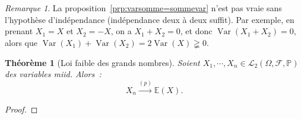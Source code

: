 \documentclass{article}
\newcommand{\E}{\mathbb E}
\renewcommand{\P}{\mathbb P}
\newcommand{\espproba}[3]{\left(#1, #2, #3\right)}  %
\newcommand{\Ofp}{\espproba \Omega{\mathcal F}\P}  %
\newcommand{\Ld}{\mathcal L_2\Ofp}  %
\newcommand{\convp}{\stackrel {(p)}\to}  %
\DeclareMathOperator{\Var}{Var}
\newtheorem{thm}{Théorème}[section]
\theoremstyle{definition}
\theoremstyle{remark}
\newtheorem*{rmq}{Remarque}
\begin{document}
		\begin{rmq} La proposition~\ref{prp:varsomme=sommevar} n'est pas vraie sans l'hypothèse d'indépendance (indépendance deux à deux suffit). Par exemple,
		en prenant $X_1 = X$ et $X_2 = -X$, on a $X_1+X_2 = 0$, et donc $\Var(X_1+X_2) = 0$, alors que $\Var(X_1) + \Var(X_2) = 2\Var(X) \gneqq 0$. \end{rmq}

		\begin{thm}[Loi faible des grands nombres] Soient $X_1, \dotsb, X_n \in \Ld$ des variables miid. Alors~:
		\[X_n \convp \E(X).\]
		\end{thm}

		\begin{proof}
		\end{proof}
\end{document}
